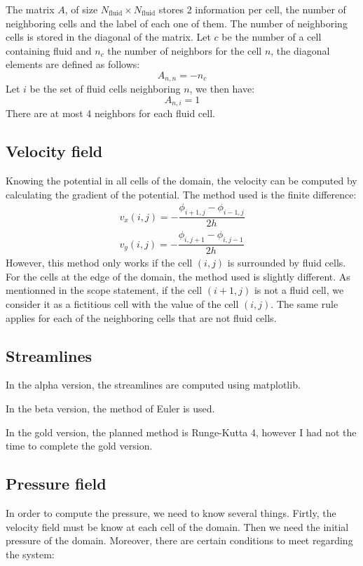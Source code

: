 The matrix $A$, of size $N_\text{fluid} \times N_\text{fluid}$ stores 2
information per cell, the number of neighboring cells and the label of each
one of them. The number of neighboring cells is stored in the diagonal of the
 matrix. Let $c$ be the number of a cell containing fluid and $n_c$ the number
 of neighbors for the cell $n$, the diagonal elements are defined as follows:
\[
      A_{n, n} = -n_c
\]
Let $i$ be the set of fluid cells neighboring $n$, we then have:
\[
      A_{n, i} = 1
\]
There are at most 4 neighbors for each fluid cell.

\subsection{Velocity field}
Knowing the potential in all cells of the domain, the velocity can be computed
by calculating the gradient of the potential.
The method used is the finite difference:
\[
      \begin{array}{c}
            v_x(i, j) = - \dfrac{\phi_{i+1, j} - \phi_{i-1, j}}{2h}\\
            v_y(i, j) = - \dfrac{\phi_{i, j+1} - \phi_{i, j-1}}{2h}
      \end{array}
\]
However, this method only works if the cell $(i, j)$ is surrounded by fluid
cells. For the cells at the edge of the domain, the method used is slightly
different. As mentionned in the scope statement\cite{scope-statement}, if the
cell $(i+1, j)$ is not a fluid cell, we consider it as a fictitious cell with
the value of the cell $(i, j)$. The same rule applies for each of the
neighboring cells that are not fluid cells.

\subsection{Streamlines}
In the alpha version, the streamlines are computed using matplotlib.

In the beta version, the method of Euler is used.

In the gold version, the planned method is Runge-Kutta 4, however I had not the
time to complete the gold version.

\subsection{Pressure field}
In order to compute the pressure, we need to know several things. Firtly, the
velocity field must be know at each cell of the domain. Then we need the
initial pressure of the domain. Moreover, there are certain conditions to meet
regarding the system:

